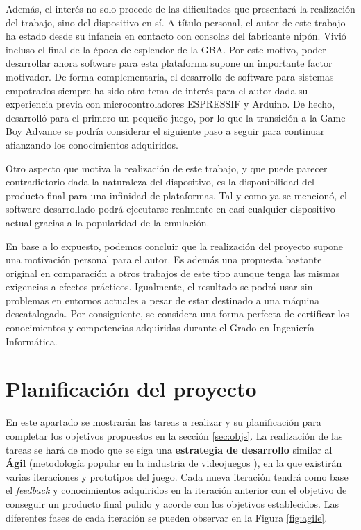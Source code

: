 Además, el interés no solo procede de las dificultades que presentará la realización del trabajo, sino del dispositivo en sí. A título personal, el autor de este trabajo ha estado desde su infancia en contacto con consolas del fabricante nipón. Vivió incluso el final de la época de esplendor de la GBA. Por este motivo, poder desarrollar ahora software para esta plataforma supone un importante factor motivador. De forma complementaria, el desarrollo de software para sistemas empotrados siempre ha sido otro tema de interés para el autor dada su experiencia previa con microcontroladores ESPRESSIF\cite{doi:10.1177/0020294019857748} y Arduino. De hecho, desarrolló para el primero un pequeño juego, por lo que la transición a la Game Boy Advance se podría considerar el siguiente paso a seguir para continuar afianzando los conocimientos adquiridos.

Otro aspecto que motiva la realización de este trabajo, y que puede parecer contradictorio dada la naturaleza del dispositivo, es la disponibilidad del producto final para una infinidad de plataformas. Tal y como ya se mencionó, el software desarrollado podrá ejecutarse realmente en casi cualquier dispositivo actual gracias a la popularidad de la emulación.

En base a lo expuesto, podemos concluir que la realización del proyecto supone una motivación personal para el autor. Es además una propuesta bastante original en comparación a otros trabajos de este tipo aunque tenga las mismas exigencias a efectos prácticos. Igualmente, el resultado se podrá usar sin problemas en entornos actuales a pesar de estar destinado a una máquina descatalogada. Por consiguiente, se considera una forma perfecta de certificar los conocimientos y competencias adquiridas durante el Grado en Ingeniería Informática.

\section{Planificación del proyecto}
En este apartado se mostrarán las tareas a realizar y su planificación para completar los objetivos propuestos en la sección \ref{sec:objs}. La realización de las tareas se hará de modo que se siga una \textbf{estrategia de desarrollo} similar al \textbf{Ágil} (metodología popular en la industria de videojuegos \cite{bib:paper6,bib:agile_course}), en la que existirán varias iteraciones y prototipos del juego. Cada nueva iteración tendrá como base el \textit{feedback} y conocimientos adquiridos en la iteración anterior con el objetivo de conseguir un producto final pulido y acorde con los objetivos establecidos. Las diferentes fases de cada iteración se pueden observar en la Figura \ref{fig:agile}.

